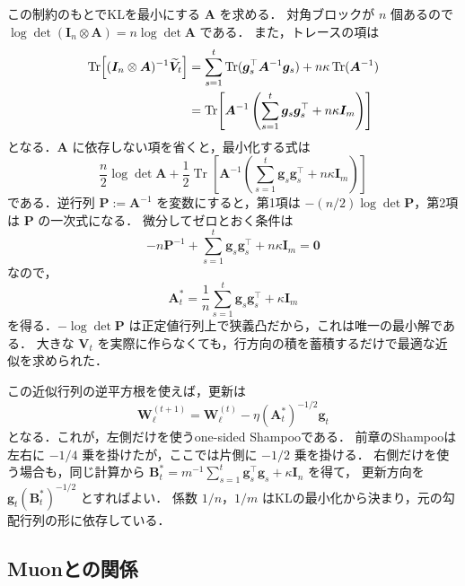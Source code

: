 \documentclass[../main.tex]{subfiles}
\begin{document}
この制約のもとでKLを最小にする $\bm{A}$ を求める．
対角ブロックが $n$ 個あるので $\log\det(\bm{I}_n\otimes\bm{A})=n\log\det\bm{A}$ である．
また，トレースの項は
\begin{align}
  \operatorname{Tr}\!\left[(\bm{I}_n\otimes\bm{A})^{-1}
  \widetilde{\bm{V}}_t\right]
  &=\sum_{s=1}^t\operatorname{Tr}
  (\bm{g}_s^\top\bm{A}^{-1}\bm{g}_s)
  +n\kappa\operatorname{Tr}(\bm{A}^{-1})\notag\\
  &=\operatorname{Tr}\!\left[\bm{A}^{-1}
  \left(\sum_{s=1}^t\bm{g}_s\bm{g}_s^\top+n\kappa\bm{I}_m\right)\right]
  \label{eq:adagrad-one-sided-trace}
\end{align}
となる．$\bm{A}$ に依存しない項を省くと，最小化する式は
\begin{equation}
  \frac{n}{2}\log\det\bm{A}
  +\frac12\operatorname{Tr}\!\left[\bm{A}^{-1}
  \left(\sum_{s=1}^t\bm{g}_s\bm{g}_s^\top+n\kappa\bm{I}_m\right)\right]
  \label{eq:adagrad-one-sided-objective}
\end{equation}
である．逆行列 $\bm{P}:=\bm{A}^{-1}$ を変数にすると，第1項は $-(n/2)\log\det\bm{P}$，第2項は $\bm{P}$ の一次式になる．
微分してゼロとおく条件は
\begin{equation}
  -n\bm{P}^{-1}
  +\sum_{s=1}^t\bm{g}_s\bm{g}_s^\top+n\kappa\bm{I}_m=\bm{0}
\end{equation}
なので，
\begin{equation}
  \bm{A}_t^*
  =\frac1n\sum_{s=1}^t\bm{g}_s\bm{g}_s^\top+\kappa\bm{I}_m
  \label{eq:adagrad-one-sided-optimum}
\end{equation}
を得る．$-\log\det\bm{P}$ は正定値行列上で狭義凸だから，これは唯一の最小解である．
大きな $\bm{V}_t$ を実際に作らなくても，行方向の積を蓄積するだけで最適な近似を求められた．

この近似行列の逆平方根を使えば，更新は
\begin{equation}
  \bm{W}_\ell^{(t+1)}
  =\bm{W}_\ell^{(t)}-\eta(\bm{A}_t^*)^{-1/2}\bm{g}_t
  \label{eq:adagrad-one-sided-shampoo}
\end{equation}
となる．これが，左側だけを使うone-sided Shampooである．
前章のShampooは左右に $-1/4$ 乗を掛けたが，ここでは片側に $-1/2$ 乗を掛ける．
右側だけを使う場合も，同じ計算から
$\bm{B}_t^*=m^{-1}\sum_{s=1}^t\bm{g}_s^\top\bm{g}_s+\kappa\bm{I}_n$ を得て，
更新方向を $\bm{g}_t(\bm{B}_t^*)^{-1/2}$ とすればよい．
係数 $1/n$，$1/m$ はKLの最小化から決まり，元の勾配行列の形に依存している．

\subsection{Muonとの関係}
\end{document}

